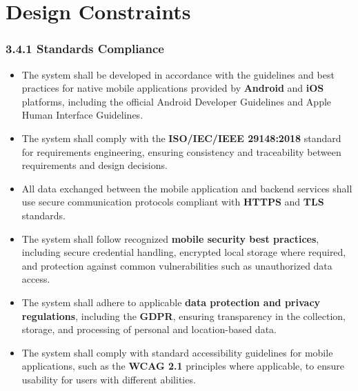 \section{Design Constraints}

\subsubsection{3.4.1 Standards Compliance}
\begin{itemize}
    \item The system shall be developed in accordance with the guidelines and best practices for native mobile applications provided by \textbf{Android} and \textbf{iOS} platforms, including the official Android Developer Guidelines and Apple Human Interface Guidelines.
    
    \item The system shall comply with the \textbf{ISO/IEC/IEEE 29148:2018} standard for requirements engineering, ensuring consistency and traceability between requirements and design decisions.
    
    \item All data exchanged between the mobile application and backend services shall use secure communication protocols compliant with \textbf{HTTPS} and \textbf{TLS} standards.
    
    \item The system shall follow recognized \textbf{mobile security best practices}, including secure credential handling, encrypted local storage where required, and protection against common vulnerabilities such as unauthorized data access.
    
    \item The system shall adhere to applicable \textbf{data protection and privacy regulations}, including the \textbf{GDPR}, ensuring transparency in the collection, storage, and processing of personal and location-based data.
    
    \item The system shall comply with standard accessibility guidelines for mobile applications, such as the \textbf{WCAG 2.1} principles where applicable, to ensure usability for users with different abilities.
\end{itemize}


